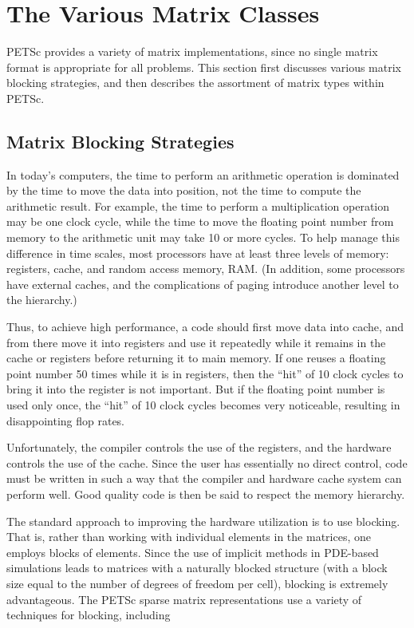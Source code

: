\chapter{The Various Matrix Classes}
\label{sec:matclasses}

PETSc provides a variety of matrix implementations, since no single
matrix format is appropriate for all problems.  This section first
discusses various matrix blocking strategies, and then
describes the assortment of matrix types within PETSc.

\section{Matrix Blocking Strategies}

In today's computers, the time to perform an arithmetic operation is
dominated by the time to move the data into position, not the time to
compute the arithmetic result.  For example, the time to perform a
multiplication operation may be one clock cycle, while the time to
move the floating point number from memory to the arithmetic unit may
take 10 or more cycles. To help manage this difference in time scales,
most processors have at least three levels of memory: registers,
cache, and random access memory, RAM. (In addition, some processors
have external caches, and the complications of paging introduce
another level to the hierarchy.)

Thus, to achieve high performance, a code should first move data into
cache, and from there move it into registers and use it repeatedly
while it remains in the cache or registers before returning it to main
memory. If one reuses a floating point number 50 times while it is in
registers, then the ``hit'' of 10 clock cycles to bring it into the
register is not important. But if the floating point number is used
only once, the ``hit'' of 10 clock cycles becomes very noticeable,
resulting in disappointing flop rates.

Unfortunately, the compiler controls the use of the registers, and the
hardware controls the use of the cache. Since the user has essentially
no direct control, code must be written in such a way that the
compiler and hardware cache system can perform well. Good quality code
is then be said to respect the memory hierarchy.

The standard approach to improving the hardware utilization is to use
blocking. That is, rather than working with individual elements in
the matrices, one employs blocks of elements.  Since the use of
implicit methods in PDE-based simulations leads to matrices with a
naturally blocked structure (with a block size equal to the number of
degrees of freedom per cell), blocking is extremely advantageous.  The
PETSc sparse matrix representations use a variety
of techniques for blocking, including

